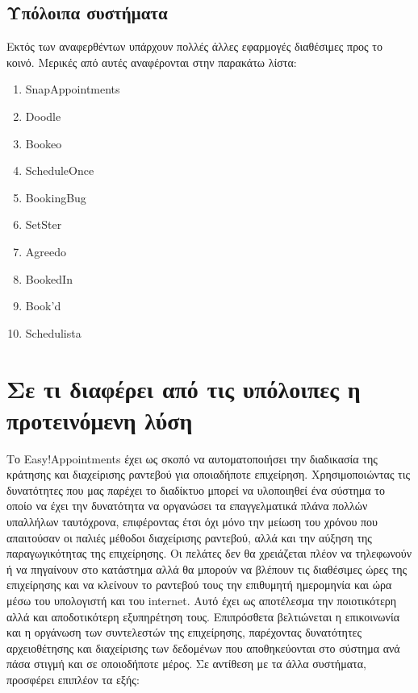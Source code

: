 \subsection{Υπόλοιπα συστήματα}
Εκτός των αναφερθέντων υπάρχουν πολλές άλλες εφαρμογές διαθέσιμες προς το κοινό. Μερικές από αυτές αναφέρονται στην παρακάτω λίστα:
\begin{enumerate}
\item SnapAppointments
\item Doodle
\item Bookeo
\item ScheduleOnce
\item BookingBug
\item SetSter
\item Agreedo
\item BookedIn
\item Book'd
\item Schedulista
\end{enumerate}

\section{Σε τι διαφέρει από τις υπόλοιπες η προτεινόμενη λύση}
Το Easy!Appointments έχει ως σκοπό να αυτοματοποιήσει την διαδικασία της κράτησης και διαχείρισης ραντεβού για οποιαδήποτε επιχείρηση. Χρησιμοποιώντας τις δυνατότητες που μας παρέχει το διαδίκτυο μπορεί να υλοποιηθεί ένα σύστημα το οποίο να έχει την δυνατότητα να οργανώσει τα επαγγελματικά πλάνα πολλών υπαλλήλων ταυτόχρονα, επιφέροντας έτσι όχι μόνο την μείωση του χρόνου που απαιτούσαν οι παλιές μέθοδοι διαχείρισης ραντεβού, αλλά και την αύξηση της παραγωγικότητας της επιχείρησης. Οι πελάτες δεν θα χρειάζεται πλέον να τηλεφωνούν ή να πηγαίνουν στο κατάστημα αλλά θα μπορούν να βλέπουν τις διαθέσιμες ώρες της επιχείρησης και να κλείνουν το ραντεβού τους την επιθυμητή ημερομηνία και ώρα μέσω του υπολογιστή και του internet. Αυτό έχει ως αποτέλεσμα την ποιοτικότερη αλλά και αποδοτικότερη εξυπηρέτηση τους. Επιπρόσθετα βελτιώνεται η επικοινωνία και η οργάνωση των συντελεστών της επιχείρησης, παρέχοντας δυνατότητες αρχειοθέτησης και διαχείρισης των δεδομένων που αποθηκεύονται στο σύστημα ανά πάσα στιγμή και σε οποιοδήποτε μέρος. Σε αντίθεση με τα άλλα συστήματα, προσφέρει επιπλέον τα εξής:

